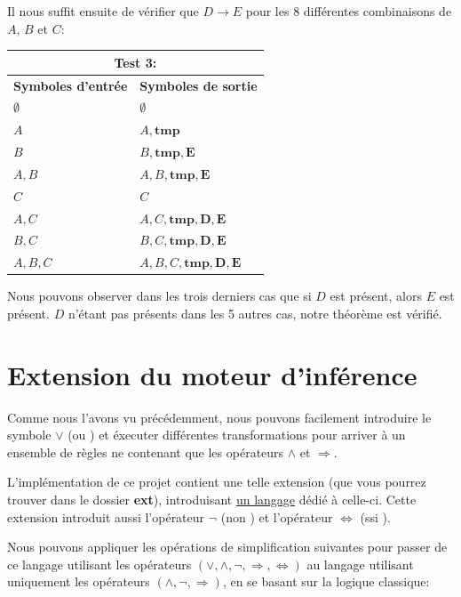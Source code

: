 \documentclass[12pt]{article}
\begin{document}
Il nous suffit ensuite de vérifier que $D \rightarrow E$ pour les 8 différentes combinaisons de $A$, $B$ et $C$:

\begin{tabular}{|p{4cm}|p{6.5cm}|}
  \hline
  \multicolumn{2}{|c|}{\textbf{Test 3:}} \\
  \hline
  \textbf{Symboles d'entrée} & \textbf{Symboles de sortie} \\
  \hline
  $\emptyset$ & $\emptyset$ \\
  \hline
  $A$ & $A, \mathbf{tmp}$ \\
  \hline
  $B$ & $B, \mathbf{tmp}, \mathbf{E}$ \\
  \hline
  $A, B$ & $A, B, \mathbf{tmp}, \mathbf{E}$ \\
  \hline
  $C$ & $C$ \\
  \hline
  $A, C$ & $A, C, \mathbf{tmp}, \mathbf{D}, \mathbf{E}$ \\
  \hline
  $B, C$ & $B, C, \mathbf{tmp}, \mathbf{D}, \mathbf{E}$ \\
  \hline
  $A, B, C$ & $A, B, C, \mathbf{tmp}, \mathbf{D}, \mathbf{E}$ \\
  \hline
\end{tabular}

Nous pouvons observer dans les trois derniers cas que si $D$ est présent, alors $E$ est présent.
$D$ n'étant pas présents dans les 5 autres cas, notre théorème est vérifié.

\section{Extension du moteur d'inférence}

Comme nous l'avons vu précédemment, nous pouvons facilement introduire le symbole $\lor$ (\og ou \fg) et éxecuter différentes transformations pour arriver à un ensemble de règles ne contenant que les opérateurs $\land$ et $\Rightarrow$.

L'implémentation de ce projet contient une telle extension (que vous pourrez trouver dans le dossier \textbf{ext}), introduisant \href{https://github.com/adri326/lo21-project/blob/main/ext/grammar.ebnf}{un langage} dédié à celle-ci.
Cette extension introduit aussi l'opérateur $\neg$ (\og non \fg) et l'opérateur $\Leftrightarrow$ (\og ssi \fg).

Nous pouvons appliquer les opérations de simplification suivantes pour passer de ce langage utilisant les opérateurs \((\lor, \land, \neg, \Rightarrow, \Leftrightarrow)\) au langage utilisant uniquement les opérateurs \((\land, \neg, \Rightarrow)\), en se basant sur la logique classique:
\end{document}
